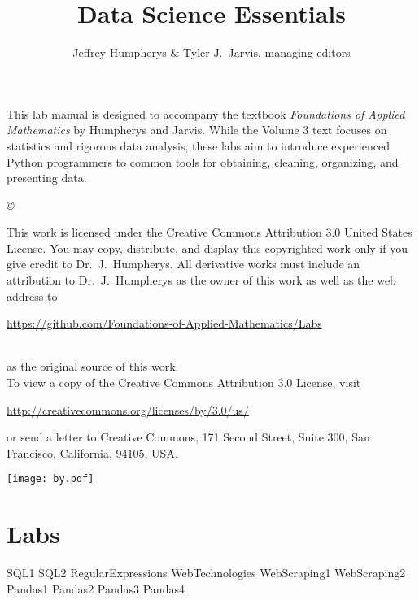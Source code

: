 \documentclass[opener-c,labs,grey,nociteref]{HJnewsiambook}
\title{Data Science Essentials}
\author{Jeffrey Humpherys \& Tyler J.~Jarvis, managing editors}
\begin{document}

\thispagestyle{empty} %
\maketitle
\thispagestyle{empty}
\frontmatter



\begin{thepreface} %

This lab manual is designed to accompany the textbook \emph{Foundations of Applied Mathematics} by Humpherys and Jarvis.
While the Volume 3 text focuses on statistics and rigorous data analysis, these labs aim to introduce experienced Python programmers to common tools for obtaining, cleaning, organizing, and presenting data.

\vfill
\copyright{This work is licensed under the Creative Commons Attribution 3.0 United States License.
You may copy, distribute, and display this copyrighted work only if you give credit to Dr.~J.~Humpherys.
All derivative works must include an attribution to Dr.~J.~Humpherys as the owner of this work as well as the web address to
\\\centerline{\url{https://github.com/Foundations-of-Applied-Mathematics/Labs}}\\as the original source of this work.
\\To view a copy of the Creative Commons Attribution 3.0 License, visit
\\\centerline{\url{http://creativecommons.org/licenses/by/3.0/us/}} or send a letter to Creative Commons, 171 Second Street, Suite 300, San Francisco, California, 94105, USA.}

\vfill
\centering\texttt{[image: by.pdf]}
\vfill
\end{thepreface}

\setcounter{tocdepth}{1}
\tableofcontents

\mainmatter %

\part{Labs}
{SQL1}
{SQL2}
{RegularExpressions}
{WebTechnologies}
{WebScraping1}
{WebScraping2}
{Pandas1}
{Pandas2}
{Pandas3}
{Pandas4}
\end{document}
